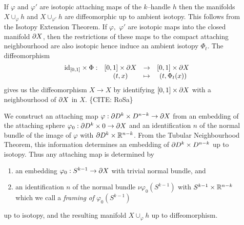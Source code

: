 \begin{rmk}
	If $\varphi$ and $\varphi'$ are isotopic attaching maps of the $k$--handle $h$ then the manifolds $X\cup_\varphi h$ and $X\cup_{\varphi'} h$ are diffeomorphic up to ambient isotopy.
	This follows from the Isotopy Extension Theorem.
	If $\varphi,$ $\varphi'$ are isotopic maps into the closed manifold $\partial X$, then the restrictions of these maps to the compact attaching neighbourhood are also isotopic hence induce an ambient isotopy $\Phi_t$.
	The diffeomorphism
	\[
		\begin{array}{cccc}
			\textrm{id}_{[0,1]}\times\Phi: & [0,1]\times \partial X & \to & [0,1]\times\partial X \\
									 & (t,x) & \mapsto & (t,\Phi_t(x))
		\end{array}
	\]
	gives us the diffeomorphism $X\to X$ by identifying $[0,1]\times\partial X$ with a neighbourhood of $\partial X$ in $X$. \{CITE: RoSa\}
	
	We construct an attaching map $\varphi:\partial D^k\times D^{n-k}\to\partial X$ from an embedding of the attaching sphere $\varphi_0:\partial D^k\times 0\to \partial X$ and an identification $n$ of the normal bundle of the image of $\varphi$ with $\partial D^k \times \mathbb{R}^{n-k}$.
	From the Tubular Neighbourhood Theorem, this information determines an embedding of $\partial D^k\times D^{n-k}$ up to isotopy.
	Thus any attaching map is determined by
	\begin{enumerate}
	  \item an embedding $\varphi_0:S^{k-1}\to\partial X$ with trivial normal bundle, and
	  \item an identification $n$ of the normal bundle $\nu\varphi_0(S^{k-1})$ with $S^{k-1}\times\mathbb{R}^{n-k}$ which we call a \emph{framing of} $\varphi_0(S^{k-1})$
	\end{enumerate}
	up to isotopy, and the resulting manifold $X\cup_\varphi h$ up to diffeomorphism.
\end{rmk}

